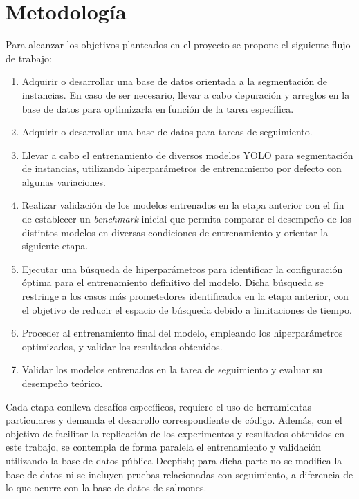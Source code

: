\section{Metodología}
Para alcanzar los objetivos planteados en el proyecto se propone el siguiente flujo de trabajo:

\begin{enumerate}
    \item Adquirir o desarrollar una base de datos orientada a la segmentación de instancias. En caso de ser necesario, llevar a cabo depuración y arreglos en la base de datos para optimizarla en función de la tarea específica.
    \item Adquirir o desarrollar una base de datos para tareas de seguimiento.
    \item Llevar a cabo el entrenamiento de diversos modelos YOLO para segmentación de instancias, utilizando hiperparámetros de entrenamiento por defecto con algunas variaciones.
    \item Realizar validación de los modelos entrenados en la etapa anterior con el fin de establecer un \textit{benchmark} inicial que permita comparar el desempeño de los distintos modelos en diversas condiciones de entrenamiento y orientar la siguiente etapa.
    \item Ejecutar una búsqueda de hiperparámetros para identificar la configuración óptima para el entrenamiento definitivo del modelo. Dicha búsqueda se restringe a los casos más prometedores identificados en la etapa anterior, con el objetivo de reducir el espacio de búsqueda debido a limitaciones de tiempo.
    \item Proceder al entrenamiento final del modelo, empleando los hiperparámetros optimizados, y validar los resultados obtenidos.
    \item Validar los modelos entrenados en la tarea de seguimiento y evaluar su desempeño teórico.
\end{enumerate}

Cada etapa conlleva desafíos específicos, requiere el uso de herramientas particulares y demanda el desarrollo correspondiente de código. Además, con el objetivo de facilitar la replicación de los experimentos y resultados obtenidos en este trabajo, se contempla de forma paralela el entrenamiento y validación utilizando la base de datos pública Deepfish; para dicha parte no se modifica la base de datos ni se incluyen pruebas relacionadas con seguimiento, a diferencia de lo que ocurre con la base de datos de salmones.